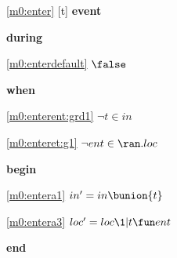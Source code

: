 \noindent \ref{m0:enter} [t] \textbf{event}
\begin{block}
\item \textbf{during}
\begin{block}
\item[ \eqref{m0:enterdefault} ]$\false$ %
\end{block}
\item \textbf{when}
\begin{block}
\item[ \eqref{m0:enterent:grd1} ]$\neg t \in in $ %
\item[ \eqref{m0:enteret:g1} ]$\neg ent \in \ran.loc $ %
\end{block}
\item \textbf{begin}
\begin{block}
\item[ \eqref{m0:entera1} ]$in' = in \bunion \{ t \} $ %
\item[ \eqref{m0:entera3} ]$loc' = loc \1| t \fun ent $ %
\end{block}
\item \textbf{end} \\
\end{block}
